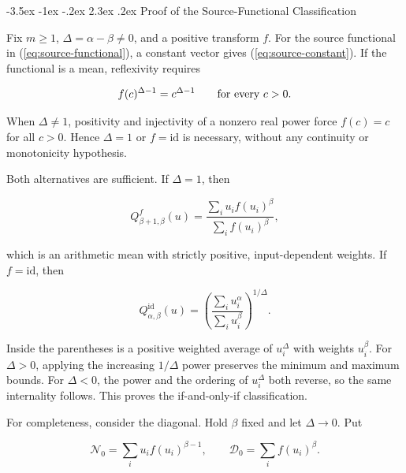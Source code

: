 \documentclass[12pt,a4paper,oneside]{report}
\makeatletter
\renewcommand\section{\@startsection{section}{1}{\z@}%
  {-3.5ex \@plus -1ex \@minus -.2ex}%
  {2.3ex \@plus .2ex}%
  {\normalfont\fontsize{14}{17}\selectfont\bfseries}}
\makeatother
\begin{document}
\section{Proof of the Source-Functional Classification}
\label{sec:proof-source-classification}

Fix $m\geq1$, $\Delta=\alpha-\beta\neq0$, and a positive transform $f$.
For the source functional in (\ref{eq:source-functional}), a constant vector
gives (\ref{eq:source-constant}). If the functional is a mean, reflexivity
requires

\begin{equation}
  f(c)^{\Delta-1}=c^{\Delta-1}
  \qquad\hbox{for every }c>0.
  \label{eq:appendix-source-reflexivity}
\end{equation}

When $\Delta\neq1$, positivity and injectivity of a nonzero real power force
$f(c)=c$ for all $c>0$. Hence $\Delta=1$ or $f=\mathrm{id}$ is necessary,
without any continuity or monotonicity hypothesis.

Both alternatives are sufficient. If $\Delta=1$, then

\begin{equation}
  Q_{\beta+1,\beta}^{f}(u)
  =\frac{\sum_i u_i f(u_i)^\beta}{\sum_i f(u_i)^\beta},
  \label{eq:appendix-source-gap-one}
\end{equation}

which is an arithmetic mean with strictly positive, input-dependent weights.
If $f=\mathrm{id}$, then

\begin{equation}
  Q_{\alpha,\beta}^{\mathrm{id}}(u)
  =\left(\frac{\sum_i u_i^\alpha}{\sum_i u_i^\beta}
   \right)^{1/\Delta}.
  \label{eq:appendix-source-gini}
\end{equation}

Inside the parentheses is a positive weighted average of $u_i^\Delta$ with
weights $u_i^\beta$. For $\Delta>0$, applying the increasing
$1/\Delta$ power preserves the minimum and maximum bounds. For
$\Delta<0$, the power and the ordering of $u_i^\Delta$ both reverse, so the
same internality follows. This proves the if-and-only-if classification.

For completeness, consider the diagonal. Hold $\beta$ fixed and let
$\Delta\to0$. Put

\begin{equation}
  \mathcal N_0=\sum_i u_i f(u_i)^{\beta-1},
  \qquad \mathcal D_0=\sum_i f(u_i)^\beta.
  \label{eq:source-diagonal-components}
\end{equation}
\end{document}
